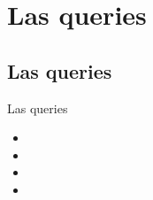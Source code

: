 \section{Las queries}

\subsection{Las queries}
\begin{frame}{Las queries}
  \begin{itemize}
    \item 
    \item 
    \item 
    \item 
  \end{itemize}
\end{frame}
